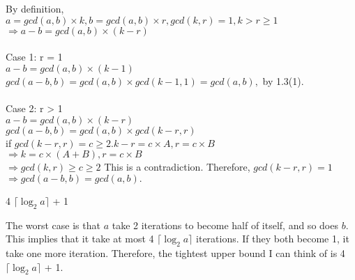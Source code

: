 \documentclass[11pt]{homework}
\begin{document}
\begin{arabicpartsdsa}
        By definition,  \\
        \(a = gcd(a, b) \times k, b = gcd(a, b) \times r, gcd(k, r) = 1,  k > r \geq 1 \) \\
        \(\Rightarrow a - b = gcd(a, b)\times(k - r)\) \\ \\
        Case 1: r = 1 \\
        \(a - b = gcd(a, b)\times(k - 1)\)  \\
        \(gcd(a - b, b) = gcd(a, b)\times gcd(k-1, 1) = gcd(a, b),\) by 1.3(1). \\ \\
        Case 2: r > 1 \\
        \(a - b = gcd(a, b)\times(k - r)\) \\
        \(gcd(a - b, b) = gcd(a, b)\times gcd(k-r, r)\) \\
        if \(gcd(k-r, r) = c \geq 2. k - r = c \times A, r = c \times B\) \\
        \(\Rightarrow k = c \times (A+B), r = c \times B\) \\
        \(\Rightarrow gcd(k, r) \geq c \geq 2 \)
        This is a contradiction. Therefore, 
        \(gcd(k-r, r) = 1\) \\
        \(\Rightarrow gcd(a-b, b) = gcd(a, b).\) \\

    \item

        4 \times $\lceil \log_2 a \rceil$ + 1

        The worst case is that \(a\) take 2 iterations to become half of itself, and so does \(b\).
        This implies that it take at most 4 \times $\lceil \log_2 a \rceil$ iterations. If they both
        become 1, it take one more iteration. Therefore, the tightest upper bound I can think of is 
        4 \times $\lceil \log_2 a \rceil$ + 1.

    \end{arabicpartsdsa}

\question
\end{document}
